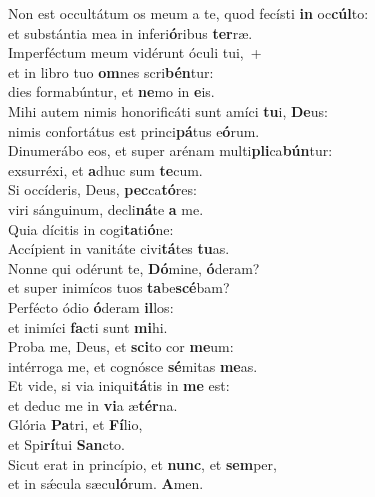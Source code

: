 \evenverse Non est occultátum os meum a te, quod fecísti \textbf{in} oc\textbf{cúl}to:~\*\\
\evenverse et substántia mea in inferi\textbf{ó}ribus \textbf{ter}ræ.\\
\oddverse Imperféctum meum vidérunt óculi tui,~+\\
\oddverse  et in libro tuo \textbf{om}nes scri\textbf{bén}tur:~\*\\
\oddverse dies formabúntur, et \textbf{ne}mo in \textbf{e}is.\\
\evenverse Mihi autem nimis honorificáti sunt amíci \textbf{tu}i, \textbf{De}us:~\*\\
\evenverse nimis confortátus est princi\textbf{pá}tus e\textbf{ó}rum.\\
\oddverse Dinumerábo eos, et super arénam multi\textbf{pli}ca\textbf{bún}tur:~\*\\
\oddverse exsurréxi, et \textbf{a}dhuc sum \textbf{te}cum.\\
\evenverse Si occíderis, Deus, \textbf{pec}ca\textbf{tó}res:~\*\\
\evenverse viri sánguinum, decli\textbf{ná}te \textbf{a} me.\\
\oddverse Quia dícitis in cogi\textbf{ta}ti\textbf{ó}ne:~\*\\
\oddverse Accípient in vanitáte civi\textbf{tá}tes \textbf{tu}as.\\
\evenverse Nonne qui odérunt te, \textbf{Dó}mine, \textbf{ó}deram?~\*\\
\evenverse et super inimícos tuos \textbf{ta}be\textbf{scé}bam?\\
\oddverse Perfécto ódio \textbf{ó}deram \textbf{il}los:~\*\\
\oddverse et inimíci \textbf{fa}cti sunt \textbf{mi}hi.\\
\evenverse Proba me, Deus, et \textbf{sci}to cor \textbf{me}um:~\*\\
\evenverse intérroga me, et cognósce \textbf{sé}mitas \textbf{me}as.\\
\oddverse Et vide, si via iniqui\textbf{tá}tis in \textbf{me} est:~\*\\
\oddverse et deduc me in \textbf{vi}a æ\textbf{tér}na.\\
\evenverse Glória \textbf{Pa}tri, et \textbf{Fí}lio,~\*\\
\evenverse et Spi\textbf{rí}tui \textbf{San}cto.\\
\oddverse Sicut erat in princípio, et \textbf{nunc}, et \textbf{sem}per,~\*\\
\oddverse et in sǽcula sæcu\textbf{ló}rum. \textbf{A}men.\\
